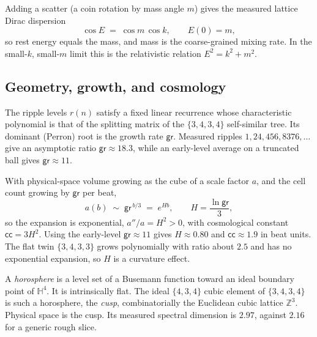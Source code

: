\begin{result}
Adding a scatter (a coin rotation by mass angle $m$) gives the measured lattice Dirac dispersion
\[
\cos E \;=\; \cos m \,\cos k, \qquad E(0) = m,
\]
so rest energy equals the mass, and mass is the coarse-grained mixing rate. In the small-$k$, small-$m$ limit
this is the relativistic relation $E^2 = k^2 + m^2$.
\end{result}

\subsection{Geometry, growth, and cosmology}

\begin{proposition}
The ripple levels $r(n)$ satisfy a fixed linear recurrence whose characteristic polynomial is that of the
splitting matrix of the $\{3,4,3,4\}$ self-similar tree. Its dominant (Perron) root is the growth rate
$\mathsf{gr}$. Measured ripples $1, 24, 456, 8376, \ldots$ give an asymptotic ratio $\mathsf{gr} \approx 18.3$,
while an early-level average on a truncated ball gives $\mathsf{gr} \approx 11$.
\end{proposition}

\begin{result}
With physical-space volume growing as the cube of a scale factor $a$, and the cell count growing by $\mathsf{gr}$
per beat,
\[
a(b) \;\sim\; \mathsf{gr}^{\,b/3} \;=\; e^{H b}, \qquad H = \frac{\ln \mathsf{gr}}{3},
\]
so the expansion is exponential, $a''/a = H^2 > 0$, with cosmological constant $\mathsf{cc} = 3 H^2$. Using the
early-level $\mathsf{gr} \approx 11$ gives $H \approx 0.80$ and $\mathsf{cc} \approx 1.9$ in beat units. The flat
twin $\{3,4,3,3\}$ grows polynomially with ratio about $2.5$ and has no exponential expansion, so $H$ is a
curvature effect.
\end{result}

\begin{definition}
A \emph{horosphere} is a level set of a Busemann function toward an ideal boundary point of $\mathbb{H}^4$. It is
intrinsically flat. The ideal $\{4,3,4\}$ cubic element of $\{3,4,3,4\}$ is such a horosphere, the \emph{cusp},
combinatorially the Euclidean cubic lattice $\mathbb{Z}^3$. Physical space is the cusp. Its measured spectral
dimension is $2.97$, against $2.16$ for a generic rough slice.
\end{definition}

